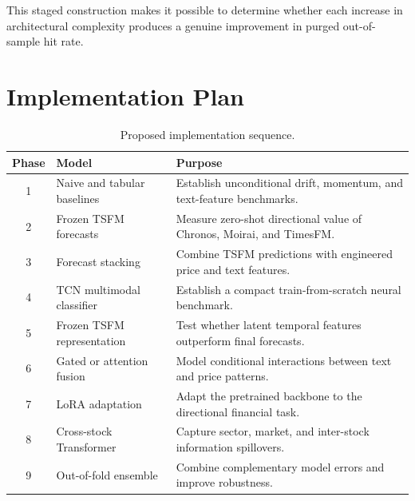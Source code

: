 \documentclass[11pt]{article}
\begin{document}
This staged construction makes it possible to determine whether each increase
in architectural complexity produces a genuine improvement in purged
out-of-sample hit rate.

\section{Implementation Plan}

\begin{table}[ht]
\centering
\caption{Proposed implementation sequence.}
\begin{tabular}{clp{}}
\toprule
\textbf{Phase} & \textbf{Model} & \textbf{Purpose} \\
\midrule
1
&
Naive and tabular baselines
&
Establish unconditional drift, momentum, and text-feature benchmarks.
\\

2
&
Frozen TSFM forecasts
&
Measure zero-shot directional value of Chronos, Moirai, and TimesFM.
\\

3
&
Forecast stacking
&
Combine TSFM predictions with engineered price and text features.
\\

4
&
TCN multimodal classifier
&
Establish a compact train-from-scratch neural benchmark.
\\

5
&
Frozen TSFM representation
&
Test whether latent temporal features outperform final forecasts.
\\

6
&
Gated or attention fusion
&
Model conditional interactions between text and price patterns.
\\

7
&
LoRA adaptation
&
Adapt the pretrained backbone to the directional financial task.
\\

8
&
Cross-stock Transformer
&
Capture sector, market, and inter-stock information spillovers.
\\

9
&
Out-of-fold ensemble
&
Combine complementary model errors and improve robustness.
\\
\bottomrule
\end{tabular}
\end{table}

\end{document}
